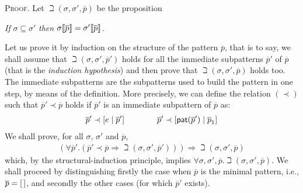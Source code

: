 \noindent\textsc{Proof}. Let \(\beth(\sigma, \sigma', \overline{p})\)
be the proposition
\begin{center}
\emph{If} \(\sigma \subseteq \sigma'\) 
\emph{then} \(\subst{\overline{p}}{\sigma} =
  \subst{\overline{p}}{\sigma'}\).
\end{center}
Let us prove it by induction on the structure of the pattern
\(\overline{p}\), that is to say, we shall assume that \(\beth(\sigma,
\sigma', \overline{p}')\) holds for all the immediate subpatterns
\(\overline{p}'\) of \(\overline{p}\) (that is the \emph{induction
  hypothesis}) and then prove that \(\beth(\sigma, \sigma',
\overline{p})\) holds too. The immediate subpatterns are the
subpatterns used to build the pattern in one step, by means of the
definition. More precisely, we can define the relation \((\prec)\)
such that \(\overline{p}' \prec \overline{p}\) holds if
\(\overline{p}'\) is an immediate subpattern of \(\overline{p}\) as:
\begin{gather*}
\overline{p}' \prec \cons{e}{\overline{p}'} \qquad\qquad 
\overline{p}' \prec \cons{\pat{\overline{p}'}}{\overline{p}_1}
\end{gather*}
We shall prove, for all \(\sigma\), \(\sigma'\) and \(\overline{p}\),
\begin{gather*}
(\forall \overline{p}'.(\overline{p}' \prec \overline{p} \Rightarrow
  \beth(\sigma, \sigma', \overline{p}'))) \Rightarrow \beth(\sigma,
  \sigma', \overline{p})
\end{gather*}
which, by the structural\hyp{}induction principle, implies \(\forall
\sigma, \sigma', \overline{p}.\beth(\sigma, \sigma',
\overline{p})\). We shall proceed by distinguishing firstly the case
when \(\overline{p}\) is the minimal pattern, i.e., \(\overline{p} =
\el\), and secondly the other cases (for which \(\overline{p}'\)
exists).
